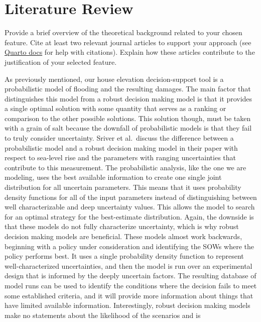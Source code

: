 \documentclass[
  11pt,
]{article}
\begin{document}
\section{Literature Review}\label{literature-review}

Provide a brief overview of the theoretical background related to your
chosen feature. Cite at least two relevant journal articles to support
your approach (see
\href{https://quarto.org/docs/authoring/footnotes-and-citations.html}{Quarto
docs} for help with citations). Explain how these articles contribute to
the justification of your selected feature.

As previously mentioned, our house elevation decision-support tool is a
probabilistic model of flooding and the resulting damages. The main
factor that distinguishes this model from a robust decision making model
is that it provides a single optimal solution with some quantity that
serves as a ranking or comparison to the other possible solutions. This
solution though, must be taken with a grain of salt because the downfall
of probabilistic models is that they fail to truly consider uncertainty.
Sriver et al.~discuss the difference between a probabilistic model and a
robust decision making model in their paper with respect to sea-level
rise and the parameters with ranging uncertainties that contribute to
this measurement. The probabilistic analysis, like the one we are
modeling, uses the best available information to create one single joint
distribution for all uncertain parameters. This means that it uses
probability density functions for all of the input parameters instead of
distinguishing between well characterizable and deep uncertainty values.
This allows the model to search for an optimal strategy for the
best-estimate distribution. Again, the downside is that these models do
not fully characterize uncertainty, which is why robust decision making
models are beneficial. These models almost work backwards, beginning
with a policy under consideration and identifying the SOWs where the
policy performs best. It uses a single probability density function to
represent well-characterized uncertainties, and then the model is run
over an experimental design that is informed by the deeply uncertain
factors. The resulting database of model runs can be used to identify
the conditions where the decision fails to meet some established
criteria, and it will provide more information about things that have
limited available information. Interestingly, robust decision making
models make no statements about the likelihood of the scenarios and is
\end{document}
